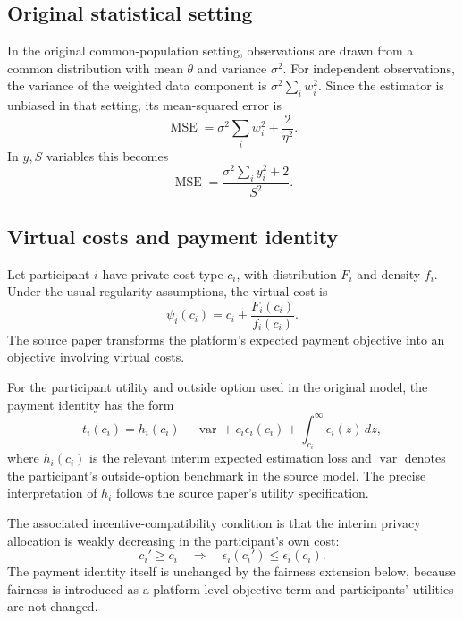 \documentclass[11pt,a4paper]{article}
\newcommand{\1}{\mathbf{1}}
\newcommand{\MSE}{\operatorname{MSE}}
\begin{document}
\subsection{Original statistical setting}

In the original common-population setting, observations are drawn from a
common distribution with mean \(\theta\) and variance \(\sigma^2\). For
independent observations, the variance of the weighted data component is
\(\sigma^2\sum_i w_i^2\). Since the estimator is unbiased in that setting,
its mean-squared error is
\begin{equation}
  \MSE
  =\sigma^2\sum_i w_i^2+\frac{2}{\eta^2}.
\end{equation}
In \(y,S\) variables this becomes
\begin{equation}
  \MSE
  =\frac{\sigma^2\sum_i y_i^2+2}{S^2}.
\end{equation}

\subsection{Virtual costs and payment identity}

Let participant \(i\) have private cost type \(c_i\), with distribution
\(F_i\) and density \(f_i\). Under the usual regularity assumptions, the
virtual cost is
\begin{equation}
  \psi_i(c_i)=c_i+\frac{F_i(c_i)}{f_i(c_i)}.
  \label{eq:virtual-cost}
\end{equation}
The source paper transforms the platform's expected payment objective into
an objective involving virtual costs.

For the participant utility and outside option used in the original model,
the payment identity has the form
\begin{equation}
  t_i(c_i)
  =h_i(c_i)-\operatorname{var}
   +c_i\epsilon_i(c_i)
   +\int_{c_i}^{\infty}\epsilon_i(z)\,dz,
  \label{eq:payment-identity}
\end{equation}
where \(h_i(c_i)\) is the relevant interim expected estimation loss and
\(\operatorname{var}\) denotes the participant's outside-option benchmark
in the source model. The precise interpretation of \(h_i\) follows the
source paper's utility specification.

The associated incentive-compatibility condition is that the interim
privacy allocation is weakly decreasing in the participant's own cost:
\begin{equation}
  c_i'\geq c_i
  \quad\Longrightarrow\quad
  \epsilon_i(c_i')\leq \epsilon_i(c_i).
\end{equation}
The payment identity itself is unchanged by the fairness extension below,
because fairness is introduced as a platform-level objective term and
participants' utilities are not changed.
\end{document}
